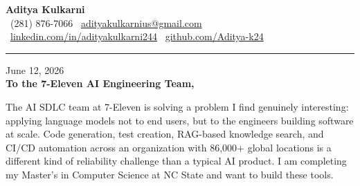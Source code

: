 \documentclass[11pt,letterpaper]{article}
\begin{document}
\begin{center}
    {\Huge \textbf{\color{SevenGreen} Aditya Kulkarni}}\\[8pt]
    {\color{DarkGrey} \small
    \faPhone \ (281) 876-7066 \quad \textbar \quad
    \faEnvelope \ \href{mailto:adityakulkarnius@gmail.com}{adityakulkarnius@gmail.com} \\[4pt]
    \faLinkedin \ \href{https://linkedin.com/in/adityakulkarni244}{linkedin.com/in/adityakulkarni244} \quad \textbar \quad
    \faGithub \ \href{https://github.com/Aditya-k24}{github.com/Aditya-k24}
    }
\end{center}

\vspace{-4pt}
{\color{SevenGreen}\rule{\linewidth}{1.5pt}}
\vspace{10pt}

June 12, 2026\\[10pt]
\textbf{To the 7-Eleven AI Engineering Team,}

\vspace{6pt}

The AI SDLC team at 7-Eleven is solving a problem I find genuinely interesting: applying language models not to end users, but to the engineers building software at scale. Code generation, test creation, RAG-based knowledge search, and CI/CD automation across an organization with 86,000+ global locations is a different kind of reliability challenge than a typical AI product. I am completing my Master's in Computer Science at NC State and want to build these tools.

\vspace{4pt}
\end{document}

